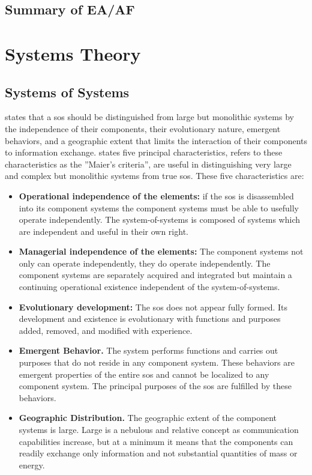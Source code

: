 \subsection{Summary of EA/AF}
\label{sub:sfsummaryenterprisearchitecture}

\section{Systems Theory}
\label{sec:sfsystemstheory}

\subsection{Systems of Systems}
\label{sub:systemsofsystems}

\textcite{Maier1996} states that a \acrfull{sos} should be distinguished from large but monolithic systems by the independence of their components, their evolutionary nature, emergent behaviors, and a geographic extent that limits the interaction of their components to information exchange. \textcite{Maier1996} states five principal characteristics, \textcite{Dersin2014} refers to these characteristics as the ''Maier’s criteria'', are useful in distinguishing very large and complex but monolithic systems from true \acrshort{sos}. These five characteristics are:

\begin{itemize}
	\item{\textbf{Operational independence of the elements:} if the \acrshort{sos} is disassembled into its component systems the component systems must be able to usefully operate independently. The	system-of-systems is composed of systems which are independent and useful in their own right.}
	\item{\textbf{Managerial independence of the elements:} The component systems not only can operate independently, they do operate independently. The component systems are separately acquired and integrated but maintain a continuing operational existence independent of the system-of-systems.}
	\item{\textbf{Evolutionary development:} The \acrshort{sos} does not appear fully formed. Its development and existence is evolutionary with functions and purposes added, removed, and modified with experience.}
	\item{\textbf{Emergent Behavior.} The system performs functions and carries out purposes that do not reside in any component system. These behaviors are emergent properties of the entire \acrshort{sos} and cannot be localized to any component system. The principal purposes of the \acrshort{sos} are fulfilled by these behaviors.}
	\item{\textbf{Geographic Distribution.} The geographic extent of the component systems is large. Large is a nebulous and relative concept as communication capabilities increase, but at a minimum it means that the components can readily exchange only information and not substantial quantities of mass or energy.}
\end{itemize}

